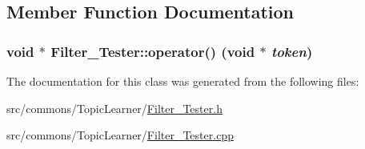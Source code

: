 \subsection{Member Function Documentation}
\hypertarget{class_filter___tester_a9c204f911facc101baac1bc79d617133}{
\subsubsection[{operator()}]{\setlength{\rightskip}{0pt plus 5cm}void $\ast$ Filter\_\-Tester::operator() (void $\ast$ {\em token})}}
\label{class_filter___tester_a9c204f911facc101baac1bc79d617133}


The documentation for this class was generated from the following files:\begin{DoxyCompactItemize}
\item 
src/commons/TopicLearner/\hyperlink{_filter___tester_8h}{Filter\_\-Tester.h}\item 
src/commons/TopicLearner/\hyperlink{_filter___tester_8cpp}{Filter\_\-Tester.cpp}\end{DoxyCompactItemize}
